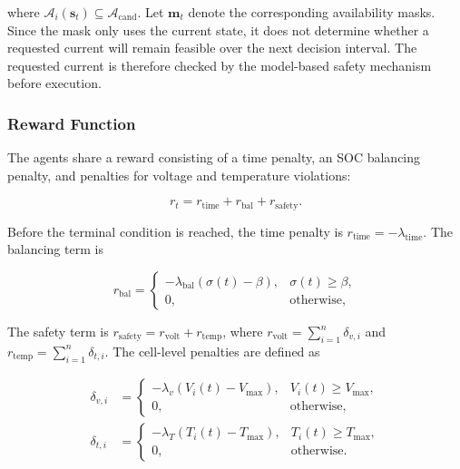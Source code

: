 where $\mathcal{A}_i(\mathbf{s}_t)\subseteq\mathcal{A}_{\mathrm{cand}}$. Let $\mathbf{m}_t$ denote the corresponding availability masks. Since the mask only uses the current state, it does not determine whether a requested current will remain feasible over the next decision interval. The requested current is therefore checked by the model-based safety mechanism before execution.

\subsubsection{Reward Function}

The agents share a reward consisting of a time penalty, an SOC balancing penalty, and penalties for voltage and temperature violations:

\begin{equation}
\label{eq:reward}
r_t
=
r_{\mathrm{time}}
+
r_{\mathrm{bal}}
+
r_{\mathrm{safety}}.
\end{equation}

Before the terminal condition is reached, the time penalty is $r_{\mathrm{time}}=-\lambda_{\mathrm{time}}$. The balancing term is

\begin{equation}
\label{eq:balance_reward}
r_{\mathrm{bal}}
=
\begin{cases}
-\lambda_{\mathrm{bal}}(\sigma(t)-\beta),
& \sigma(t)\geq\beta,\\
0,
& \text{otherwise},
\end{cases}
\end{equation}


The safety term is
$r_{\mathrm{safety}}=r_{\mathrm{volt}}+r_{\mathrm{temp}}$,
where
$r_{\mathrm{volt}}=\sum_{i=1}^{n}\delta_{v,i}$ and
$r_{\mathrm{temp}}=\sum_{i=1}^{n}\delta_{t,i}$.
The cell-level penalties are defined as

\begin{equation}
\label{eq:safety_reward}
\begin{aligned}
\delta_{v,i}
&=
\begin{cases}
-\lambda_v\left(V_i(t)-V_{\max}\right),
& V_i(t)\geq V_{\max},\\
0,
& \text{otherwise},
\end{cases}
\\[4pt]
\delta_{t,i}
&=
\begin{cases}
-\lambda_T\left(T_i(t)-T_{\max}\right),
& T_i(t)\geq T_{\max},\\
0,
& \text{otherwise}.
\end{cases}
\end{aligned}
\end{equation}

